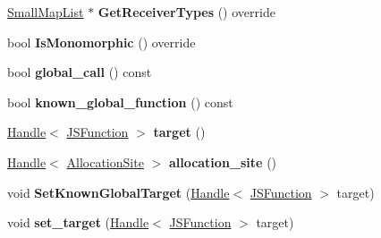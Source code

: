 \begin{DoxyCompactItemize}
\item 
\hyperlink{classv8_1_1internal_1_1_small_map_list}{Small\+Map\+List} $\ast$ {\bfseries Get\+Receiver\+Types} () override\hypertarget{classv8_1_1internal_1_1_call_ab648fd1d59b2812b8e8b09cfe995ed53}{}\label{classv8_1_1internal_1_1_call_ab648fd1d59b2812b8e8b09cfe995ed53}

\item 
bool {\bfseries Is\+Monomorphic} () override\hypertarget{classv8_1_1internal_1_1_call_a32c37ad75fed4d772b681819aad2fcc7}{}\label{classv8_1_1internal_1_1_call_a32c37ad75fed4d772b681819aad2fcc7}

\item 
bool {\bfseries global\+\_\+call} () const \hypertarget{classv8_1_1internal_1_1_call_aa55c715fe02c96e4cdbb21dbb3da2cf8}{}\label{classv8_1_1internal_1_1_call_aa55c715fe02c96e4cdbb21dbb3da2cf8}

\item 
bool {\bfseries known\+\_\+global\+\_\+function} () const \hypertarget{classv8_1_1internal_1_1_call_aa76c263178ab305534d86ebd1f4d5012}{}\label{classv8_1_1internal_1_1_call_aa76c263178ab305534d86ebd1f4d5012}

\item 
\hyperlink{classv8_1_1internal_1_1_handle}{Handle}$<$ \hyperlink{classv8_1_1internal_1_1_j_s_function}{J\+S\+Function} $>$ {\bfseries target} ()\hypertarget{classv8_1_1internal_1_1_call_affae4bf17f670631de48396679bd89d9}{}\label{classv8_1_1internal_1_1_call_affae4bf17f670631de48396679bd89d9}

\item 
\hyperlink{classv8_1_1internal_1_1_handle}{Handle}$<$ \hyperlink{classv8_1_1internal_1_1_allocation_site}{Allocation\+Site} $>$ {\bfseries allocation\+\_\+site} ()\hypertarget{classv8_1_1internal_1_1_call_a582dc7fb02a5372dd1d3de0816e7af9d}{}\label{classv8_1_1internal_1_1_call_a582dc7fb02a5372dd1d3de0816e7af9d}

\item 
void {\bfseries Set\+Known\+Global\+Target} (\hyperlink{classv8_1_1internal_1_1_handle}{Handle}$<$ \hyperlink{classv8_1_1internal_1_1_j_s_function}{J\+S\+Function} $>$ target)\hypertarget{classv8_1_1internal_1_1_call_a9000f3d244160b5f8e6e8a63fe8ad7d4}{}\label{classv8_1_1internal_1_1_call_a9000f3d244160b5f8e6e8a63fe8ad7d4}

\item 
void {\bfseries set\+\_\+target} (\hyperlink{classv8_1_1internal_1_1_handle}{Handle}$<$ \hyperlink{classv8_1_1internal_1_1_j_s_function}{J\+S\+Function} $>$ target)\hypertarget{classv8_1_1internal_1_1_call_a7e18b145b4b87ca0996b6fe37e59e50a}{}\label{classv8_1_1internal_1_1_call_a7e18b145b4b87ca0996b6fe37e59e50a}


\end{DoxyCompactItemize}
